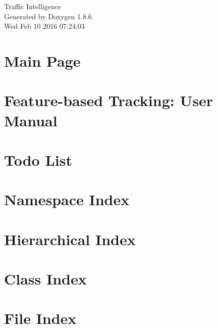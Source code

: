 \documentclass[twoside]{article}
\begin{document}
\hypersetup{pageanchor=false}
\begin{titlepage}
\vspace*{7cm}
\begin{center}%
{\Large Traffic Intelligence }\\
\vspace*{1cm}
{\large Generated by Doxygen 1.8.6}\\
\vspace*{0.5cm}
{\small Wed Feb 10 2016 07:24:03}\\
\end{center}
\end{titlepage}
\tableofcontents
{}
\hypersetup{pageanchor=true}

\section{Main Page}
\label{index}\hypertarget{index}{}
\section{Feature-\/based Tracking\-: User Manual}
\label{feature_based_tracking}
\hypertarget{feature_based_tracking}{}

\section{Todo List}
\label{todo}
\hypertarget{todo}{}

\section{Namespace Index}

\section{Hierarchical Index}

\section{Class Index}

\section{File Index}

\end{document}
